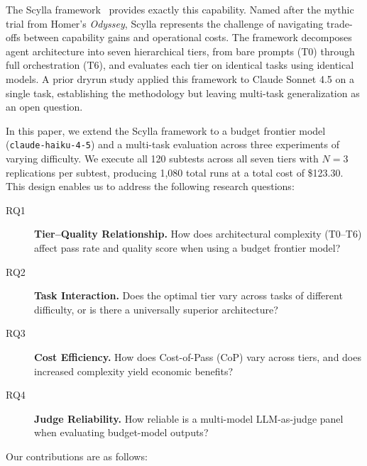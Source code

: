 \documentclass[11pt]{article}
\begin{document}
The Scylla framework~\cite{scylla2026dryrun} provides exactly this capability.
Named after the mythic trial from Homer's \emph{Odyssey}, Scylla represents
the challenge of navigating trade-offs between capability gains and operational
costs. The framework decomposes agent architecture into seven hierarchical
tiers, from bare prompts (T0) through full orchestration (T6), and evaluates
each tier on identical tasks using identical models. A prior dryrun study
applied this framework to Claude Sonnet 4.5 on a single task, establishing
the methodology but leaving multi-task generalization as an open question.

In this paper, we extend the Scylla framework to a budget frontier model
(\texttt{claude-haiku-4-5}) and a multi-task evaluation across three
experiments of varying difficulty. We execute all 120 subtests across all seven
tiers with $N=3$ replications per subtest, producing 1,080 total runs at a
total cost of \$123.30. This design enables us to address the following
research questions:

\begin{description}
  \item[RQ1] \textbf{Tier--Quality Relationship.} How does architectural
    complexity (T0--T6) affect pass rate and quality score when using a budget
    frontier model?
  \item[RQ2] \textbf{Task Interaction.} Does the optimal tier vary across
    tasks of different difficulty, or is there a universally superior
    architecture?
  \item[RQ3] \textbf{Cost Efficiency.} How does Cost-of-Pass (CoP) vary
    across tiers, and does increased complexity yield economic benefits?
  \item[RQ4] \textbf{Judge Reliability.} How reliable is a multi-model
    LLM-as-judge panel when evaluating budget-model outputs?
\end{description}

Our contributions are as follows:
\end{document}
